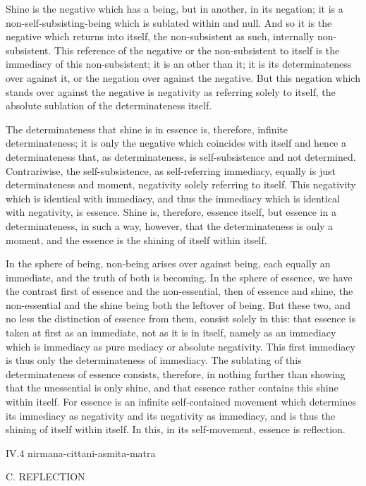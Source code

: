 Shine is the negative which has a being,
but in another, in its negation;
it is a non-self-subsisting-being
which is sublated within and null.
And so it is the negative which returns into itself,
the non-subsistent as such, internally non-subsistent.
This reference of the negative or
the non-subsistent to itself is
the immediacy of this non-subsistent;
it is an other than it;
it is its determinateness over against it,
or the negation over against the negative.
But this negation which stands over against the negative is
negativity as referring solely to itself,
the absolute sublation of the determinateness itself.

The determinateness that shine is in essence is,
therefore, infinite determinateness;
it is only the negative which coincides with itself
and hence a determinateness that, as determinateness,
is self-subsistence and not determined.
Contrariwise, the self-subsistence, as self-referring immediacy,
equally is just determinateness and moment,
negativity solely referring to itself.
This negativity which is identical with immediacy,
and thus the immediacy which is identical with negativity, is essence.
Shine is, therefore, essence itself,
but essence in a determinateness, in such a way, however,
that the determinateness is only a moment,
and the essence is the shining of itself within itself.

In the sphere of being, non-being arises over against being,
each equally an immediate, and the truth of both is becoming.
In the sphere of essence, we have the contrast
first of essence and the non-essential,
then of essence and shine,
the non-essential and the shine
being both the leftover of being.
But these two, and no less the
distinction of essence from them,
consist solely in this:
that essence is taken at first as an immediate,
not as it is in itself,
namely as an immediacy which is immediacy
as pure mediacy or absolute negativity.
This first immediacy is thus only the determinateness of immediacy.
The sublating of this determinateness of essence consists, therefore,
in nothing further than showing that the unessential is only shine,
and that essence rather contains this shine within itself.
For essence is an infinite self-contained movement
which determines its immediacy as negativity
and its negativity as immediacy,
and is thus the shining of itself within itself.
In this, in its self-movement,
essence is reflection.

IV.4
nirmana-cittani-asmita-matra

C. REFLECTION

